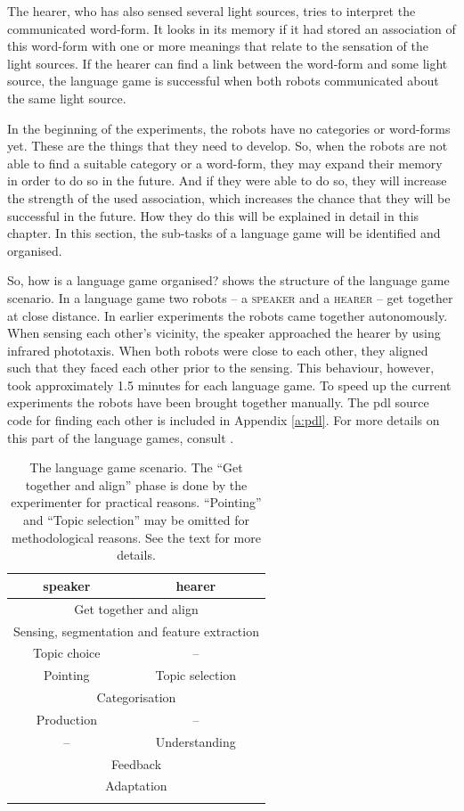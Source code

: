 \enlargethispage{1\baselineskip}
The hearer, who has also sensed several light sources, tries to interpret the communicated word-form. It looks in its memory if it had stored an association of this word-form with one or more meanings that relate to the sensation of the light sources. If the hearer can find a link between the word-form and some light source, the language game is successful when both robots communicated about the same light source.

In the beginning of the experiments, the robots have no categories or word-forms yet. These are the things that they need to develop. So, when the robots are not able to find a suitable category or a word-form, they may expand their memory in order to do so in the future. And if they were able to do so, they will increase the strength of the used association, which increases the chance that they will be successful in the future. How they do this will be explained in detail in this chapter. In this section, the sub-tasks of a language game will be identified and organised.


So, how is a language game organised?  shows the structure of the language game scenario. In a language game two robots -- a {\scshape speaker} and a {\scshape hearer} -- get together at close distance. In earlier experiments \citep{steelsvogt:1997} the robots came together autonomously. When sensing each other's vicinity, the speaker approached the hearer by using infrared phototaxis. When both robots were close to each other, they aligned such that they faced each other prior to the sensing. This behaviour, however, took approximately 1.5 minutes for each language game. To speed up the current experiments the robots have been brought together manually. The {\sc pdl} source code for finding each other is included in Appendix \ref{a:pdl}. For more details on this part of the language games, consult \citealt{vogt:1997}.  


\begin{table}
	\centering
	\begin{tabular}{cc}
		\lsptoprule
		{\sc speaker} & {\sc hearer}\\
		\midrule
		\multicolumn{2}{c}{{Get together and align}}\\\hline
		\multicolumn{2}{c}{Sensing, segmentation and feature extraction}\\\hline
		Topic choice & --\\\hline
		{Pointing} & {Topic selection}\\\hline
		\multicolumn{2}{c}{Categorisation}\\\hline
		Production & --\\\hline
		-- & Understanding\\\hline
		\multicolumn{2}{c}{Feedback}\\\hline
		\multicolumn{2}{c}{Adaptation}\\\lspbottomrule
	\end{tabular}
	\caption{The language game scenario. The ``Get together and align'' phase is done by the experimenter for practical reasons. ``Pointing'' and ``Topic selection'' may be omitted for methodological reasons. See the text for more details.}
	\label{t:scenario1}
\end{table}

